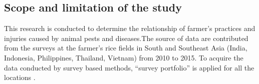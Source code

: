 \subsection{Scope and limitation of the study}

This research is conducted to determine the relationship of farmer's practices and injuries caused by animal pests and diseases.The source of data are contributed from the surveys at the farmer's rice fields in South and Southeast Asia (India, Indonesia, Philippines, Thailand, Vietnam) from 2010 to 2015. To acquire the data conducted by survey based methods, ``survey portfolio'' is applied for all the locations \citep{Savary_2009_Survey}.

